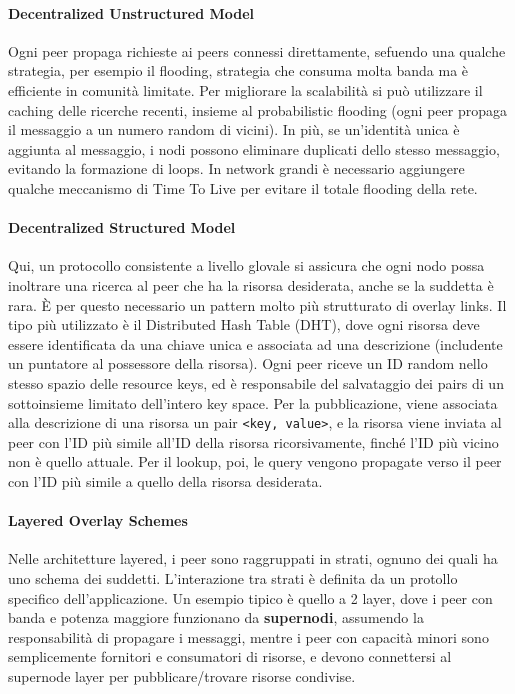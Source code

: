\documentclass[11pt]{article}
\newcommand{\code}[1]{\texttt{#1}}
\begin{document}
\paragraph{Decentralized Unstructured Model} Ogni peer propaga richieste ai peers connessi direttamente, sefuendo una qualche strategia, per esempio il flooding, strategia che consuma molta banda ma è efficiente in comunità limitate. Per migliorare la scalabilità si può utilizzare il caching delle ricerche recenti, insieme al probabilistic flooding (ogni peer propaga il messaggio a un numero random di vicini). In più, se un'identità unica è aggiunta al messaggio, i nodi possono eliminare duplicati dello stesso messaggio, evitando la formazione di loops. In network grandi è necessario aggiungere qualche meccanismo di Time To Live per evitare il totale flooding della rete.
\paragraph{Decentralized Structured Model} Qui, un protocollo consistente a livello glovale si assicura che ogni nodo possa inoltrare una ricerca al peer che ha la risorsa desiderata, anche se la suddetta è rara. È per questo necessario un pattern molto più strutturato di overlay links. Il tipo più utilizzato è il Distributed Hash Table (DHT), dove ogni risorsa deve essere identificata da una chiave unica e associata ad una descrizione (includente un puntatore al possessore della risorsa). Ogni peer riceve un ID random nello stesso spazio delle resource keys, ed è responsabile del salvataggio dei pairs di un sottoinsieme limitato dell'intero key space. Per la pubblicazione, viene associata alla descrizione di una risorsa un pair \code{<key, value>}, e la risorsa viene inviata al peer con l'ID più simile all'ID della risorsa ricorsivamente, finché l'ID più vicino non è quello attuale. Per il lookup, poi, le query vengono propagate verso il peer con l'ID più simile a quello della risorsa desiderata.
\paragraph{Layered Overlay Schemes} Nelle architetture layered, i peer sono raggruppati in strati, ognuno dei quali ha uno schema dei suddetti. L'interazione tra strati è definita da un protollo specifico dell'applicazione. Un esempio tipico è quello a 2 layer, dove i peer con banda e potenza maggiore funzionano da \textbf{supernodi}, assumendo la responsabilità di propagare i messaggi, mentre i peer con capacità minori sono semplicemente fornitori e consumatori di risorse, e devono connettersi al supernode layer per pubblicare/trovare risorse condivise. 
\end{document}
